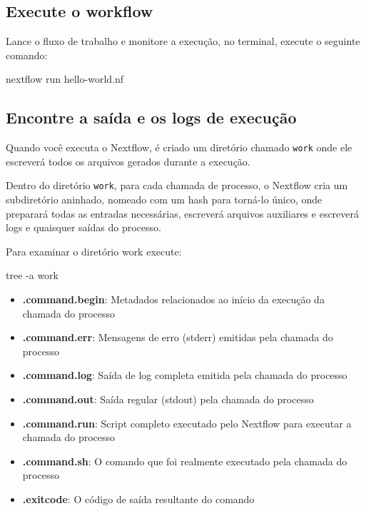 \documentclass[
  brazilian,
  letterpaper,
  DIV=11,
  numbers=noendperiod]{scrreprt}
\newenvironment{Shaded}{\begin{snugshade}}{\end{snugshade}}
\newcommand{\AttributeTok}[1]{\textcolor[rgb]{0.40,0.45,0.13}{#1}}
\newcommand{\ExtensionTok}[1]{\textcolor[rgb]{0.00,0.23,0.31}{#1}}
\newcommand{\NormalTok}[1]{\textcolor[rgb]{0.00,0.23,0.31}{#1}}
\providecommand{\tightlist}{%
  \setlength{\itemsep}{0pt}\setlength{\parskip}{0pt}}
\begin{document}
\subsection{Execute o workflow}\label{execute-o-workflow}

Lance o fluxo de trabalho e monitore a execução, no terminal, execute o
seguinte comando:

\begin{Shaded}
\begin{Highlighting}[]
\ExtensionTok{nextflow}\NormalTok{ run hello{-}world.nf}
\end{Highlighting}
\end{Shaded}

\subsection{Encontre a saída e os logs de
execução}\label{encontre-a-sauxedda-e-os-logs-de-execuuxe7uxe3o}

Quando você executa o Nextflow, é criado um diretório chamado
\texttt{work} onde ele escreverá todos os arquivos gerados durante a
execução.

Dentro do diretório \texttt{work}, para cada chamada de processo, o
Nextflow cria um subdiretório aninhado, nomeado com um hash para
torná-lo único, onde preparará todas as entradas necessárias, escreverá
arquivos auxiliares e escreverá logs e quaisquer saídas do processo.

Para examinar o diretório work execute:

\begin{Shaded}
\begin{Highlighting}[]
\ExtensionTok{tree} \AttributeTok{{-}a}\NormalTok{ work}
\end{Highlighting}
\end{Shaded}

\begin{itemize}
\tightlist
\item
  \textbf{.command.begin}: Metadados relacionados ao início da execução
  da chamada do processo
\item
  \textbf{.command.err}: Mensagens de erro (stderr) emitidas pela
  chamada do processo
\item
  \textbf{.command.log}: Saída de log completa emitida pela chamada do
  processo
\item
  \textbf{.command.out}: Saída regular (stdout) pela chamada do processo
\item
  \textbf{.command.run}: Script completo executado pelo Nextflow para
  executar a chamada do processo
\item
  \textbf{.command.sh}: O comando que foi realmente executado pela
  chamada do processo
\item
  \textbf{.exitcode}: O código de saída resultante do comando
\end{itemize}
\end{document}

